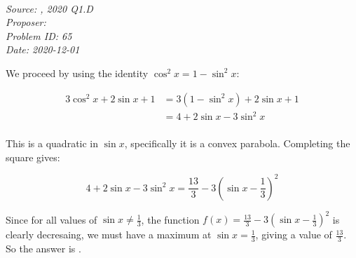 \SSbreak\\
\emph{Source: \Cmat, 2020 Q1.D}\\
\emph{Proposer: \Pss}\\
\emph{Problem ID: 65}\\
\emph{Date: 2020-12-01}\\
\SSbreak

\bigskip

\begin{solution}\hfil\medskip
    
    We proceed by using the identity \(\cos^2x=1-\sin^2x\):

    \begin{align*}
        3\cos^2x+2\sin x+1&=3(1-\sin^2x)+2\sin x+1\\
        &=4+2\sin x-3\sin^2x\\
    \end{align*}

    This is a quadratic in \(\sin x\), specifically it is a convex parabola. Completing the square gives:

    \begin{equation*}
        4+2\sin x-3\sin^2x=\frac{13}{3}-3\left(\sin x-\frac{1}{3} \right)^2
    \end{equation*}

    Since for all values of \(\sin x\ne\frac{1}{3}\), the function \(f(x)=\frac{13}{3}-3\left(\sin x-\frac{1}{3}\right)^2\) is clearly decresaing, we must have a maximum at \(\sin x=\frac{1}{3}\), giving a value of \(\frac{13}{3}\). So the answer is .

\end{solution}\bigskip


